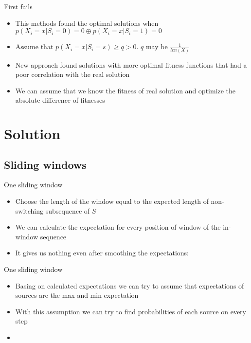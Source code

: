 \documentclass[hyperref=unicode,graphics=pdflatex,13pt]{beamer}
\begin{document}
\begin{frame}{First fails}
\begin{itemize}
   \item This methods found the optimal solutions when $p(X_i = x | S_i = 0) = 0 \oplus p(X_i = x | S_i = 1) = 0$
   \item Assume that $p(X_i = x | S_i = s) \ge q > 0$. $q$ may be $\frac{1}{len(X)}$
   \item New approach found solutions with more optimal fitness functions that had a poor correlation with the real solution
   \item We can assume that we know the fitness of real solution and optimize the absolute difference of fitnesses
\end{itemize}
\end{frame}

\section{Solution}
\subsection{Sliding windows}
\begin{frame}{One sliding window}
\begin{itemize}
   \item Choose the length of the window equal to the expected length of non-switching subsequence of $S$
   \item We can calculate the expectation for every position of window of the in-window sequence
   \item It gives us nothing even after smoothing the expectations:
\end{itemize}
\end{frame}

\begin{frame}{One sliding window}
\begin{itemize}
   \item Basing on calculated expectations we can try to assume that expectations of sources are the max and min expectation
   \item With this assumption we can try to find probabilities of each source on every step
   \item %
\end{itemize}
\end{frame}
\end{document}

